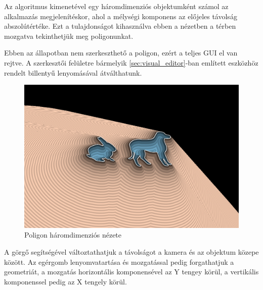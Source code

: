Az algoritmus kimenetével egy háromdimenziós objektumként számol az alkalmazás megjelenítéskor, ahol a mélységi komponens az előjeles távolság abszolútértéke. Ezt a tulajdonságot kihasználva ebben a nézetben a térben mozgatva tekinthetjük meg poligonunkat.

Ebben az állapotban nem szerkeszthető a poligon, ezért a teljes GUI el van rejtve. A szerkesztői felületre bármelyik \ref{sec:visual_editor}-ban említett eszközhöz rendelt billentyű lenyomásával átválthatunk.

\begin{figure}[H]
    \centering
    \includegraphics[width=1\linewidth]{images/3d_view.png}
    \caption{Poligon háromdimenziós nézete}
    \label{fig:3d_view-1}
\end{figure}

A görgő segítségével változtathatjuk a távolságot a kamera és az objektum közepe között. Az egérgomb lenyomvatartása és mozgatással pedig forgathatjuk a geometriát, a mozgatás horizontális komponensével az Y tengey körül, a vertikális komponenssel pedig az X tengely körül.
